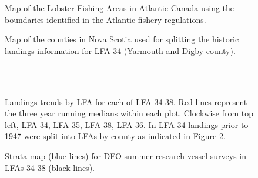 \documentclass[11pt]{article}
\newcommand{\e}{/SpinDr/backup/bio_data/bio.lobster/figures/LFA3438Framework2019/} %
\begin{document}
\begin{landscape}
\begin{figure}
\centering
    \caption{Map of the Lobster Fishing Areas in Atlantic Canada using the boundaries identified in the Atlantic fishery regulations.}

\end{figure}
\end{landscape}
\begin{figure}
\centering
    \caption{Map of the counties in Nova Scotia used for splitting the historic landings information for LFA 34 (Yarmouth and Digby county).}

\end{figure}

\begin{figure}
        \centering
    \\
                \\
                
         \caption{Landings trends by LFA for each of LFA 34-38. Red lines represent the three year running medians within each plot. Clockwise from top left, LFA 34, LFA 35, LFA 38, LFA 36. In LFA 34 landings prior to 1947 were split into LFAs by county as indicated in Figure 2. }
        \end{figure}


    \begin{figure}
    \centering
        \caption{Strata map (blue lines) for DFO summer research vessel surveys in LFAs 34-38 (black lines).}
    \end{figure}
\end{document}

